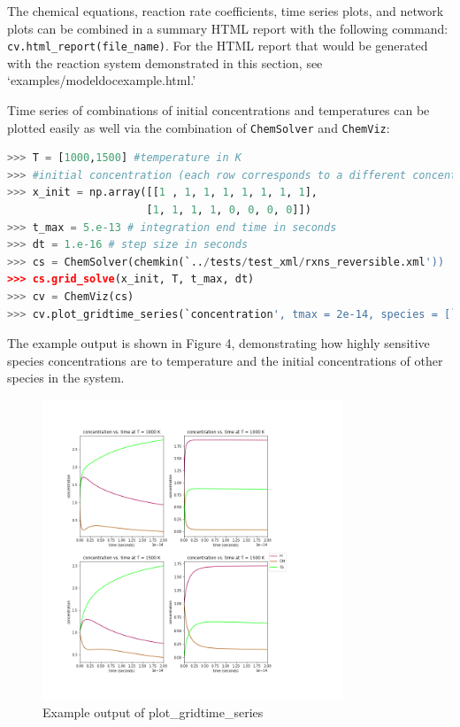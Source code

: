 \documentclass[12pt]{article}
\begin{document}
The chemical equations, reaction rate coefficients, time series plots, and network plots can be combined in a summary HTML report with the following command:\\
\texttt{cv.html\_report(file\_name)}. For the HTML report that would be generated with the reaction system demonstrated in this section, see `examples/modeldocexample.html.'

Time series of combinations of initial concentrations and temperatures can be plotted easily as well via the combination of \texttt{ChemSolver} and \texttt{ChemViz}:

\begin{lstlisting}[language = Python, basicstyle = \ttfamily,columns = fullflexible, showstringspaces = False]
>>> T = [1000,1500] #temperature in K
>>> #initial concentration (each row corresponds to a different concentration vector)
>>> x_init = np.array([[1 , 1, 1, 1, 1, 1, 1, 1],
                      [1, 1, 1, 1, 0, 0, 0, 0]]) 
>>> t_max = 5.e-13 # integration end time in seconds
>>> dt = 1.e-16 # step size in seconds
>>> cs = ChemSolver(chemkin(`../tests/test_xml/rxns_reversible.xml'))
>>> cs.grid_solve(x_init, T, t_max, dt)
>>> cv = ChemViz(cs)
>>> cv.plot_gridtime_series(`concentration', tmax = 2e-14, species = [`H', `OH', `O2'], outputfile = `modeldocfig4.png')
\end{lstlisting}

The example output is shown in Figure 4, demonstrating how highly sensitive species concentrations are to temperature and the initial concentrations of other species in the system. 

\begin{figure}[h!]
  \caption{Example output of plot\_gridtime\_series}
  \centering
  \includegraphics[width=0.8\textwidth]{../examples/modeldocfig4.png}
\end{figure} 
\end{document}
